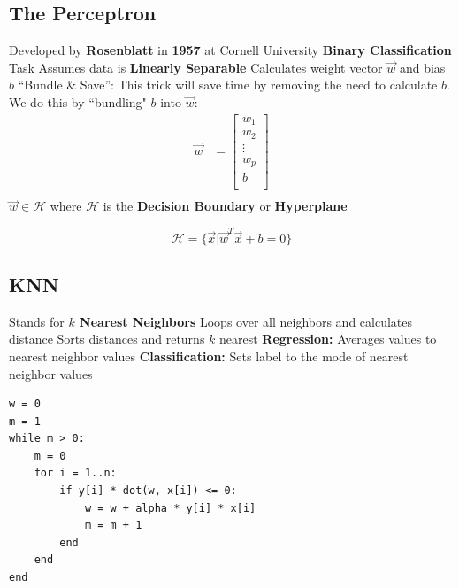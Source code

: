 \subsection{The Perceptron\cite{rosenblatt1958perceptron}}
\begin{outline}
    \1 Developed by \textbf{Rosenblatt} in \textbf{1957} at Cornell University
    \1 \textbf{Binary Classification} Task
    \1 Assumes data is \textbf{Linearly Separable}
    \1 Calculates weight vector $\vec{w}$ and bias $b$ 
    \1 ``Bundle \& Save'': This trick will save time by removing the need to calculate $b$. We do this by ``bundling" $b$ into $\vec{w}$: 
    \begin{align*}
    \vec{w} &= \begin{bmatrix}
           w_{1}    \\
           w_{2}    \\
           \vdots   \\
           w_{p}    \\
           b        \\
         \end{bmatrix} \\
    \end{align*}
    \1 $\vec{w} \in \mathcal{H}$ where $\mathcal{H}$ is the \textbf{Decision Boundary} or \textbf{Hyperplane}
    
\end{outline}

\[
\mathcal{H} = \{\vec{x} | \vec{w}^T\vec{x} + b = 0\}
\]



\subsection{KNN\cite{guo2003knn}}
\begin{outline}
    \1 Stands for \textbf{$k$ Nearest Neighbors}
    \1 Loops over all neighbors and calculates distance
    \1 Sorts distances and returns $k$ nearest
    \1 \textbf{Regression:} Averages values to nearest neighbor values
    \1 \textbf{Classification:} Sets label to the mode of nearest neighbor values
\end{outline}

\begin{verbatim}
w = 0
m = 1
while m > 0:
    m = 0
    for i = 1..n:
        if y[i] * dot(w, x[i]) <= 0:
            w = w + alpha * y[i] * x[i]
            m = m + 1
        end
    end
end
\end{verbatim}

